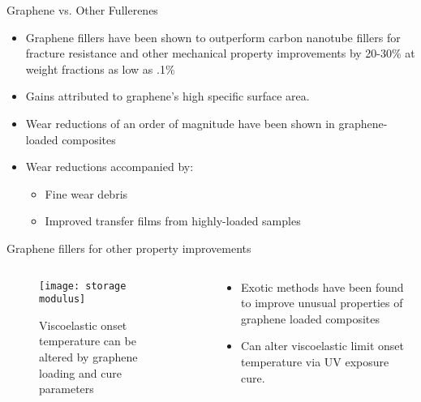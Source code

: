 \documentclass[12pt,letterpaper]{beamer}
\begin{document}
\begin{frame}{Graphene vs. Other Fullerenes}
\begin{itemize}
\item Graphene fillers have been shown to outperform carbon nanotube fillers for fracture resistance and other mechanical property improvements by 20-30\% at weight fractions as low as .1\% \cite{njuguna2007epoxy, rafiee_enhanced_2009,rafiee_fracture_2010}
\item Gains attributed to graphene's high specific surface area.
\item Wear reductions of an order of magnitude have been shown in graphene-loaded composites  \cite{kandanur_suppression_2012,shen2014tribological} 
\item Wear reductions accompanied by:
\begin{itemize}
\item Fine wear debris
\item Improved transfer films from highly-loaded samples
\end{itemize}
\end{itemize}
\end{frame}



\begin{frame}{Graphene fillers for other property improvements}
  \begin{columns}[T]
      \begin{column}{.5\textwidth}
    \begin{block}{}
\begin{figure}
  \begin{center}
    \texttt{[image: storage modulus]}
  \end{center}
  \caption[Tensile strength improvements for graphene nanocomposites]{Viscoelastic onset temperature can be altered by graphene loading and cure parameters}
\end{figure}
        \end{block}
    \end{column}
    \begin{column}{.5\textwidth}
     \begin{block}{}
\begin{itemize}
\item Exotic methods have been found to improve unusual properties of graphene loaded composites
\item Can alter viscoelastic limit onset temperature via UV exposure cure. \cite{MartinGallego20114664}
\end{itemize}
    \end{block}
    \end{column}
  \end{columns}
\end{frame}
\end{document}
